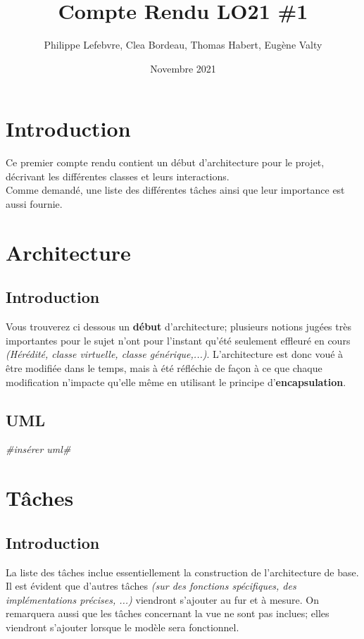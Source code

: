 \documentclass[12pt, letterpaper]{article}
\title{Compte Rendu LO21 \#1}
\author{Philippe Lefebvre, Clea Bordeau, Thomas Habert, Eugène Valty}
\date{Novembre 2021}
\begin{document}
\maketitle

\renewcommand{\contentsname}{Sommaire}
\tableofcontents

\section{Introduction}
Ce premier compte rendu contient un début d'architecture pour le projet, décrivant les différentes classes et leurs interactions.\\
Comme demandé, une liste des différentes tâches ainsi que leur importance est aussi fournie.
\section{Architecture}
\subsection{Introduction}
Vous trouverez ci dessous un \textbf{début} d'architecture; plusieurs notions jugées très importantes pour le sujet n'ont pour l'instant qu'été seulement effleuré en cours \textit{(Hérédité, classe virtuelle, classe générique,...)}. L'architecture est donc voué à être modifiée dans le temps, mais à été réfléchie de façon à ce que chaque modification n'impacte qu'elle même en utilisant le principe d'\textbf{encapsulation}.
\subsection{UML}
\textit{\#insérer uml\#}
\section{Tâches}
\subsection{Introduction}
La liste des tâches inclue essentiellement la construction de l'architecture de base. Il est évident que d'autres tâches \textit{(sur des fonctions spécifiques, des implémentations précises, ...)} viendront s'ajouter au fur et à mesure. On remarquera aussi que les tâches concernant la vue ne sont pas inclues; elles viendront s'ajouter lorsque le modèle sera fonctionnel.
\end{document}
